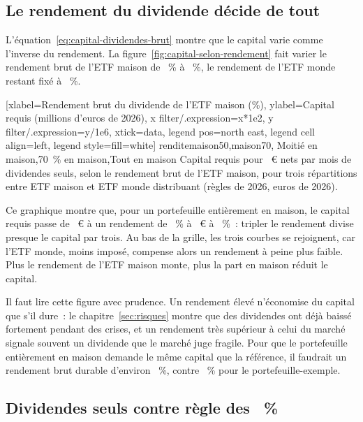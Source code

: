 \subsection{Le rendement du dividende d\'ecide de tout}\label{sec:capital-rendement}

L'\'equation~\eqref{eq:capital-dividendes-brut} montre que le capital varie comme l'inverse du
rendement. La figure~\ref{fig:capital-selon-rendement} fait varier le rendement brut de l'ETF maison
de \RenditeGrilleBas~\% \`a \RenditeGrilleHaut~\%, le rendement de l'ETF monde restant fix\'e \`a
\RenditeDivEtf~\%.

[xlabel={Rendement brut du dividende de l'ETF maison (\%)},
  ylabel={Capital requis (millions d'euros de 2026)},
  x filter/.expression={x*1e2}, y filter/.expression={y/1e6}, xtick=data,
  legend pos=north east, legend cell align=left, legend style={fill=white}]%
  {rendite}{maison50,maison70,\ColonneToutMaison}%
  {{Moiti\'e en maison},{70~\% en maison},{Tout en maison}}%
  {Capital requis pour \ZielMonat~€ nets par mois de dividendes seuls, selon le rendement brut de
  l'ETF maison, pour trois r\'epartitions entre ETF maison et ETF monde distribuant (r\`egles de 2026,
  euros de 2026).\label{fig:capital-selon-rendement}}

Ce graphique montre que, pour un portefeuille enti\`erement en maison, le capital requis passe de
\KapitalMaisonHundertRenditeBas~€ \`a un rendement de \RenditeGrilleBas~\% \`a
\KapitalMaisonHundertRenditeHaut~€ \`a \RenditeGrilleHaut~\%~: tripler le rendement divise presque le
capital par trois. Au bas de la grille, les trois courbes se rejoignent, car l'ETF monde, moins
impos\'e, compense alors un rendement \`a peine plus faible. Plus le rendement de l'ETF maison
monte, plus la part en maison r\'eduit le capital.

Il faut lire cette figure avec prudence. Un rendement \'elev\'e n'\'economise du capital que s'il dure~:
le chapitre~\ref{sec:risques} montre que des dividendes ont d\'ej\`a baiss\'e fortement pendant des crises, et un
rendement tr\`es sup\'erieur \`a celui du march\'e signale souvent un dividende que le march\'e juge
fragile. Pour que le portefeuille enti\`erement en maison demande le m\^eme capital que la r\'ef\'erence,
il faudrait un rendement brut durable d'environ \RenditeEquilibreEtf~\%, contre \RenditeDivMaison~\%
pour le portefeuille-exemple.

\subsection{Dividendes seuls contre r\`egle des \TauxRetrait~\%}\label{sec:capital-regle}

